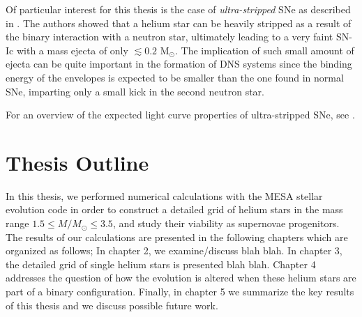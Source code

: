 \documentclass[../../main/thesis_msc.tex]{subfiles}
\begin{document}
				Of particular interest for this thesis is the case of \emph{ultra-stripped} SNe as described in \cite{Tauris_ultra, Tauris2013}. The authors showed that a helium star can be heavily stripped as a result of the binary interaction with a neutron star, ultimately leading to a very faint SN-Ic with a mass ejecta of only $\lesssim 0.2$ M$_{\odot}$. The implication of such small amount of ejecta can be quite important in the formation of DNS systems since the binding energy of the envelopes is expected to be smaller than the one found in normal SNe, imparting only a small kick in the second neutron star.
				
				For an overview of the expected light curve properties of ultra-stripped SNe, see \cite{Moriya2017}.
				
		\section{Thesis Outline}
		
			In this thesis, we performed numerical calculations with the \textsc{MESA} stellar evolution code in order to construct a detailed grid of helium stars in the mass range $1.5 \leq M / M_{\odot} \leq 3.5$, and study their viability as supernovae progenitors. The results of our calculations are presented in the following chapters which are organized as follows; In chapter 2, we examine/discuss blah blah.
			In chapter 3, the detailed grid of single helium stars is presented blah blah.
			Chapter 4 addresses the question of how the evolution is altered when these helium stars are part of a binary configuration.
			Finally, in chapter 5 we summarize the key results of this thesis and we discuss possible future work. 
				
				
    
\end{document}
